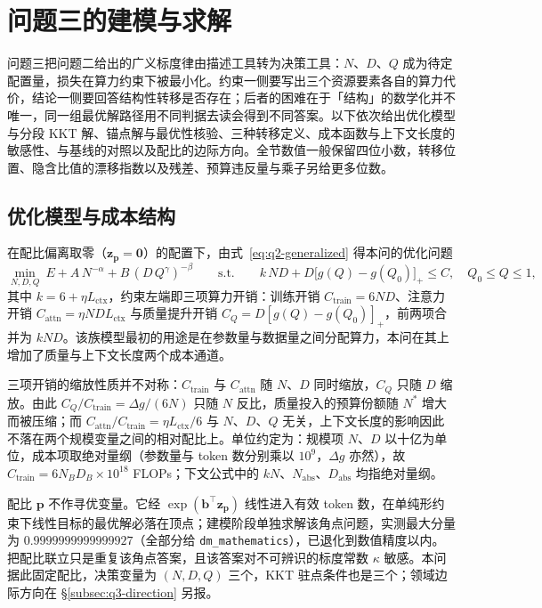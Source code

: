 \section{问题三的建模与求解}
\label{sec:problem3}

问题三把问题二给出的广义标度律由描述工具转为决策工具：$N$、$D$、$Q$ 成为待定配置量，损失在算力约束下被最小化。约束一侧要写出三个资源要素各自的算力代价，结论一侧要回答结构性转移是否存在；后者的困难在于「结构」的数学化并不唯一，同一组最优解路径用不同判据去读会得到不同答案。以下依次给出优化模型与分段 KKT 解、锚点解与最优性核验、三种转移定义、成本函数与上下文长度的敏感性、与基线的对照以及配比的边际方向。全节数值一般保留四位小数，转移位置、隐含比值的漂移指数以及残差、预算违反量与乘子另给更多位数。

\subsection{优化模型与成本结构}
\label{subsec:q3-model}

在配比偏离取零（$\boldsymbol{z}_{\boldsymbol{p}}=\boldsymbol{0}$）的配置下，由式~\eqref{eq:q2-generalized} 得本问的优化问题
\begin{equation}
  \min_{N,D,Q}\ E+A\,N^{-\alpha}+B\,(D\,Q^{\gamma})^{-\beta}
  \qquad\text{s.t.}\qquad
  k\,N D+D\bigl[g(Q)-g(Q_0)\bigr]_{+}\le C,\quad Q_0\le Q\le 1,
  \label{eq:q3-problem}
\end{equation}
其中 $k=6+\eta L_{\text{ctx}}$，约束左端即三项算力开销：训练开销 $C_{\text{train}}=6ND$、注意力开销 $C_{\text{attn}}=\eta NDL_{\text{ctx}}$ 与质量提升开销 $C_{Q}=D[g(Q)-g(Q_0)]_{+}$，前两项合并为 $kND$。该族模型最初的用途是在参数量与数据量之间分配算力\citep{kaplan2020}，本问在其上增加了质量与上下文长度两个成本通道。

三项开销的缩放性质并不对称：$C_{\text{train}}$ 与 $C_{\text{attn}}$ 随 $N$、$D$ 同时缩放，$C_{Q}$ 只随 $D$ 缩放。由此 $C_{Q}/C_{\text{train}}=\Delta g/(6N)$ 只随 $N$ 反比，质量投入的预算份额随 $N^{*}$ 增大而被压缩；而 $C_{\text{attn}}/C_{\text{train}}=\eta L_{\text{ctx}}/6$ 与 $N$、$D$、$Q$ 无关，上下文长度的影响因此不落在两个规模变量之间的相对配比上。单位约定为：规模项 $N$、$D$ 以十亿为单位，成本项取绝对量纲（参数量与 token 数分别乘以 $10^{9}$，$\Delta g$ 亦然），故 $C_{\text{train}}=6N_BD_B\times10^{18}$ FLOPs；下文公式中的 $kN$、$N_{\text{abs}}$、$D_{\text{abs}}$ 均指绝对量纲。

配比 $\boldsymbol{p}$ 不作寻优变量。它经 $\exp(\boldsymbol{b}^{\top}\boldsymbol{z}_{\boldsymbol{p}})$ 线性进入有效 token 数，在单纯形约束下线性目标的最优解必落在顶点；建模阶段单独求解该角点问题，实测最大分量为 $0.9999999999999927$（全部分给 \texttt{dm\_mathematics}），已退化到数值精度以内。把配比联立只是重复该角点答案，且该答案对不可辨识的标度常数 $\kappa$ 敏感。本问据此固定配比，决策变量为 $(N,D,Q)$ 三个，KKT 驻点条件也是三个；领域边际方向在 \S\ref{subsec:q3-direction} 另报。

